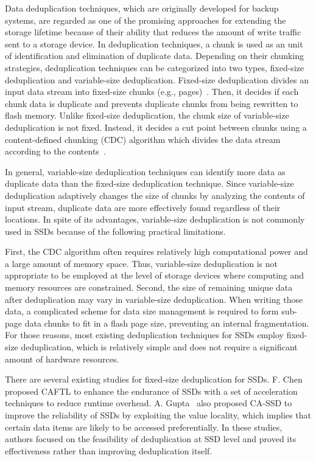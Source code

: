 Data deduplication techniques, which are originally developed for backup systems,
are regarded as one of the promising approaches for extending the storage lifetime
because of their ability that reduces the amount of write traffic sent to a storage device.
In deduplication techniques, a chunk is used as an unit of identification and elimination of duplicate data.
Depending on their chunking strategies, deduplication techniques can be categorized into two types,
fixed-size deduplication and variable-size deduplication.
Fixed-size deduplication divides an input data stream into fixed-size chunks (e.g., pages)~\cite{caftl,value-locality}. %
Then, it decides if each chunk data is duplicate and prevents duplicate chunks %
from being rewritten to flash memory.
Unlike fixed-size deduplication, 
the chunk size of variable-size deduplication is not fixed.
Instead, it decides a cut point between chunks using 
a content-defined chunking (CDC) algorithm
which divides the data stream according to the contents~\cite{dedupv1, dong}.

In general, variable-size deduplication techniques can identify more data as duplicate data than the fixed-size deduplication technique.
Since variable-size deduplication adaptively changes the size of chunks by analyzing the contents of input stream,
duplicate data are more effectively found regardless of their locations.
In spite of its advantages, variable-size deduplication is not commonly used in SSDs because of the following practical limitations.

First, the CDC algorithm often requires relatively high computational power and a large amount of memory space. 
Thus, variable-size deduplication is not appropriate to be employed at the level of 
storage devices where computing and memory resources are constrained. 
Second, the size of remaining unique data after deduplication may vary in variable-size deduplication. 
When writing those data, a complicated scheme for data size management is required 
to form sub-page data chunks to fit in a flash page size, preventing an internal fragmentation. 
For those reasons, most existing deduplication techniques for SSDs employ fixed-size deduplication, 
which is relatively simple and does not require a significant amount of hardware resources.

There are several existing studies for fixed-size deduplication for SSDs. F. Chen~\cite{caftl} proposed CAFTL 
to enhance the endurance of SSDs with a set of acceleration techniques to reduce runtime overhead. 
A. Gupta~\cite{value-locality} also proposed CA-SSD to improve the reliability of SSDs by exploiting the value locality, 
which implies that certain data items are likely to be accessed preferentially. 
In these studies, authors focused on the feasibility of deduplication at SSD level and 
proved its effectiveness rather than improving deduplication itself.

